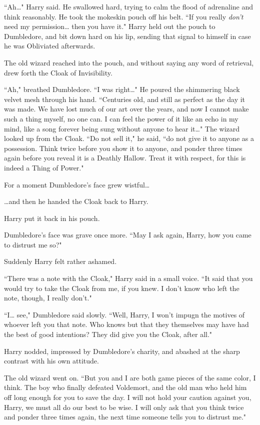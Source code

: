 ``Ah{\ldots}" Harry said. He swallowed hard, trying to calm the flood of adrenaline and think reasonably. He took the mokeskin pouch off his belt. ``If you really \emph{don't} need my permission{\ldots} then you have it." Harry held out the pouch to Dumbledore, and bit down hard on his lip, sending that signal to himself in case he was Obliviated afterwards.

The old wizard reached into the pouch, and without saying any word of retrieval, drew forth the Cloak of Invisibility.

``Ah," breathed Dumbledore. ``I was right{\ldots}" He poured the shimmering black velvet mesh through his hand. ``Centuries old, and still as perfect as the day it was made. We have lost much of our art over the years, and now I cannot make such a thing myself, no one can. I can feel the power of it like an echo in my mind, like a song forever being sung without anyone to hear it{\ldots}" The wizard looked up from the Cloak. ``Do not sell it," he said, ``do not give it to anyone as a possession. Think twice before you show it to anyone, and ponder three times again before you reveal it is a Deathly Hallow. Treat it with respect, for this is indeed a Thing of Power."

For a moment Dumbledore's face grew wistful{\ldots}

{\ldots}and then he handed the Cloak back to Harry.

Harry put it back in his pouch.

Dumbledore's face was grave once more. ``May I ask again, Harry, how you came to distrust me so?"

Suddenly Harry felt rather ashamed.

``There was a note with the Cloak," Harry said in a small voice. ``It said that you would try to take the Cloak from me, if you knew. I don't know who left the note, though, I really don't."

``I{\ldots} see," Dumbledore said slowly. ``Well, Harry, I won't impugn the motives of whoever left you that note. Who knows but that they themselves may have had the best of good intentions? They did give you the Cloak, after all."

Harry nodded, impressed by Dumbledore's charity, and abashed at the sharp contrast with his own attitude.

The old wizard went on. ``But you and I are both game pieces of the same color, I think. The boy who finally defeated Voldemort, and the old man who held him off long enough for you to save the day. I will not hold your caution against you, Harry, we must all do our best to be wise. I will only ask that you think twice and ponder three times again, the next time someone tells you to distrust me."

